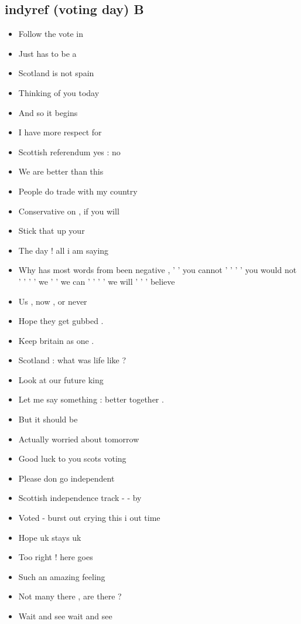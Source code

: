 \documentclass[tikz]{article}
\begin{document}
\begin{multicols}{2}
    \subsection*{indyref (voting day) B}
    \begin{itemize}[noitemsep,nolistsep,label={}]
		\item{Follow the vote in}
		\item{Just has to be a}
		\item{Scotland is not spain}
		\item{Thinking of you today}
		\item{And so it begins}
		\item{I have more respect for}
		\item{Scottish referendum yes : no}
		\item{We are better than this}
		\item{People do trade with my country}
		\item{Conservative on , if you will}
		\item{Stick that up your}
		\item{The day ! all i am saying}
		\item{Why has most words from been negative , ' ' you cannot ' ' ' ' you would not ' ' ' ' we ' ' we can ' ' ' ' we will ' ' ' believe}
		\item{Us , now , or never}
		\item{Hope they get gubbed .}
		\item{Keep britain as one .}
		\item{Scotland : what was life like ?}
		\item{Look at our future king}
		\item{Let me say something : better together .}
		\item{But it should be}
		\item{Actually worried about tomorrow}
		\item{Good luck to you scots voting}
		\item{Please don go independent}
		\item{Scottish independence track - - by}
		\item{Voted - burst out crying this i out time}
		\item{Hope uk stays uk}
		\item{Too right ! here goes}
		\item{Such an amazing feeling}
		\item{Not many there , are there ?}
		\item{Wait and see wait and see}

\end{itemize}
\end{multicols}
\end{document}
